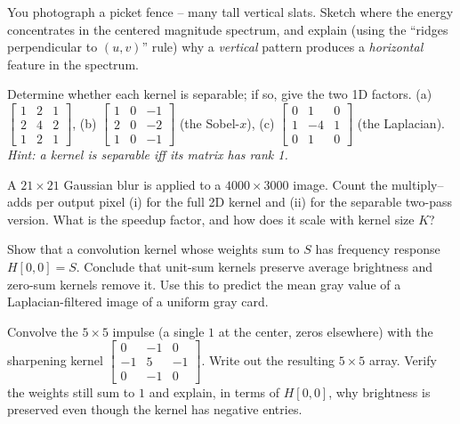 \begin{exercise}
\label{ch31:ex-streak}
You photograph a picket fence -- many tall vertical slats. Sketch where the energy
concentrates in the centered magnitude spectrum, and explain (using the
``ridges perpendicular to $(u,v)$'' rule) why a \emph{vertical} pattern produces a
\emph{horizontal} feature in the spectrum.
\end{exercise}

\begin{exercise}
\label{ch31:ex-sep-check}
Determine whether each kernel is separable; if so, give the two 1D factors.
(a) $\begin{bmatrix}1&2&1\\2&4&2\\1&2&1\end{bmatrix}$,\quad
(b) $\begin{bmatrix}1&0&-1\\2&0&-2\\1&0&-1\end{bmatrix}$ (the Sobel-$x$),\quad
(c) $\begin{bmatrix}0&1&0\\1&-4&1\\0&1&0\end{bmatrix}$ (the Laplacian).
\emph{Hint: a kernel is separable iff its matrix has rank 1.}
\end{exercise}

\begin{exercise}
\label{ch31:ex-cost}
A $21\times21$ Gaussian blur is applied to a $4000\times3000$ image. Count the
multiply--adds per output pixel (i) for the full 2D kernel and (ii) for the
separable two-pass version. What is the speedup factor, and how does it scale with
kernel size $K$?
\end{exercise}

\begin{exercise}
\label{ch31:ex-dcsum}
Show that a convolution kernel whose weights sum to $S$ has frequency response
$H[0,0]=S$. Conclude that unit-sum kernels preserve average brightness and
zero-sum kernels remove it. Use this to predict the mean gray value of a
Laplacian-filtered image of a uniform gray card.
\end{exercise}

\begin{exercise}
\label{ch31:ex-impulse}
Convolve the $5\times5$ impulse (a single $1$ at the center, zeros elsewhere) with
the sharpening kernel $\begin{bmatrix}0&-1&0\\-1&5&-1\\0&-1&0\end{bmatrix}$. Write
out the resulting $5\times5$ array. Verify the weights still sum to $1$ and explain,
in terms of $H[0,0]$, why brightness is preserved even though the kernel has
negative entries.
\end{exercise}

